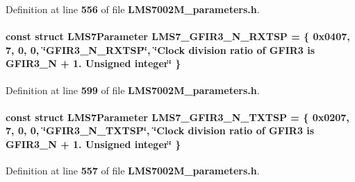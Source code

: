 Definition at line {\bf 556} of file {\bf L\+M\+S7002\+M\+\_\+parameters.\+h}.

\paragraph[{L\+M\+S7\+\_\+\+G\+F\+I\+R3\+\_\+\+N\+\_\+\+R\+X\+T\+SP}]{\setlength{\rightskip}{0pt plus 5cm}const struct {\bf L\+M\+S7\+Parameter} L\+M\+S7\+\_\+\+G\+F\+I\+R3\+\_\+\+N\+\_\+\+R\+X\+T\+SP = \{ 0x0407, 7, 0, 0, \char`\"{}\+G\+F\+I\+R3\+\_\+\+N\+\_\+\+R\+X\+T\+S\+P\char`\"{}, \char`\"{}\+Clock division ratio of G\+F\+I\+R3 is G\+F\+I\+R3\+\_\+\+N + 1. Unsigned integer\char`\"{} \}\hspace{0.3cm}{\ttfamily [static]}}\label{LMS7002M__parameters_8h_a752343f8badb37f2e21b4f8637071d7f}


Definition at line {\bf 599} of file {\bf L\+M\+S7002\+M\+\_\+parameters.\+h}.

\paragraph[{L\+M\+S7\+\_\+\+G\+F\+I\+R3\+\_\+\+N\+\_\+\+T\+X\+T\+SP}]{\setlength{\rightskip}{0pt plus 5cm}const struct {\bf L\+M\+S7\+Parameter} L\+M\+S7\+\_\+\+G\+F\+I\+R3\+\_\+\+N\+\_\+\+T\+X\+T\+SP = \{ 0x0207, 7, 0, 0, \char`\"{}\+G\+F\+I\+R3\+\_\+\+N\+\_\+\+T\+X\+T\+S\+P\char`\"{}, \char`\"{}\+Clock division ratio of G\+F\+I\+R3 is G\+F\+I\+R3\+\_\+\+N + 1. Unsigned integer\char`\"{} \}\hspace{0.3cm}{\ttfamily [static]}}\label{LMS7002M__parameters_8h_a70afc9c9f9b17b7217fa37c099fbe0c4}


Definition at line {\bf 557} of file {\bf L\+M\+S7002\+M\+\_\+parameters.\+h}.

